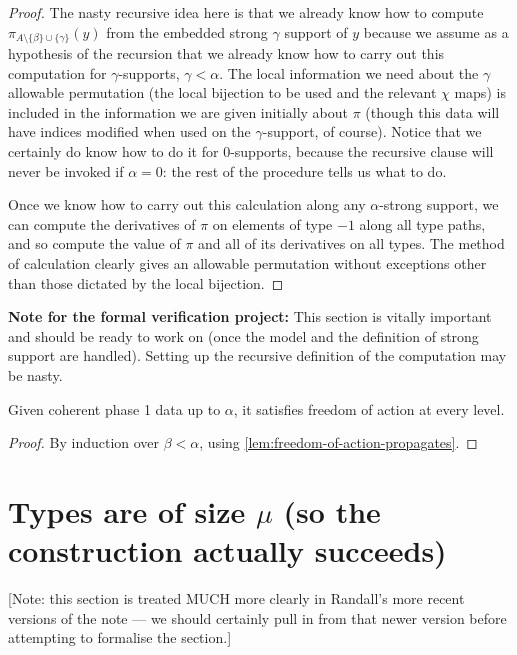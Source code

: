\begin{proof}
The nasty recursive idea here is that we already know how to compute $\pi_{A \setminus \{\beta\} \cup \{\gamma\}}(y)$ from the embedded strong $\gamma$ support of $y$ because we assume as a hypothesis of the recursion that we already know how to carry out this computation for $\gamma$-supports, $\gamma<\alpha$.  The  local information we need about the $\gamma$ allowable permutation (the local bijection to be used and the relevant $\chi$ maps) is included in the information we are given initially about $\pi$ (though this data will have indices modified when used on the $\gamma$-support, of course).  Notice that we certainly do know how to do it for 0-supports, because the recursive clause will never be invoked if $\alpha=0$:  the rest of the procedure tells us what to do.

Once we know how to carry out this calculation along any $\alpha$-strong support, we can compute the derivatives of $\pi$ on elements of type $-1$  along all type paths, and so compute the value of $\pi$ and all of its derivatives on all types.  The method of calculation clearly gives an allowable permutation without exceptions other than those dictated by the local bijection.
\end{proof}

{\bf Note for the formal verification project:}  This section is vitally important and should be ready to work on (once the model and the definition of strong support are handled).  Setting up the recursive definition of the computation may be nasty.

\begin{theorem}
  \label{thm:freedom-of-action}
  Given coherent phase 1 data up to $\alpha$, it satisfies freedom of action at every level.
\end{theorem}

\begin{proof}
  By induction over $\beta < \alpha$, using \cref{lem:freedom-of-action-propagates}.
\end{proof}


\newpage
\section{Types are of size \texorpdfstring{$\mu$}{μ} (so the construction actually succeeds)}

[Note: this section is treated MUCH more clearly in Randall’s more recent versions of the note — we should certainly pull in from that newer version before attempting to formalise the section.]

